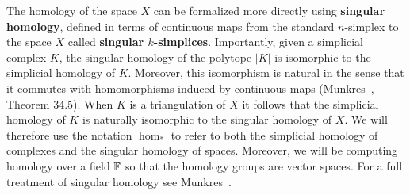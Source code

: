 The homology of the space $X$ can be formalized more directly using \textbf{singular homology}, defined in terms of continuous maps from the standard $n$-simplex to the space $X$ called \textbf{singular $k$-simplices}.
Importantly, given a simplicial complex $K$, the singular homology of the polytope $|K|$ is isomorphic to the simplicial homology of $K$.
Moreover, this isomorphism is natural in the sense that it commutes with homomorphisms induced by continuous maps (Munkres~\cite{munkres84elements}, Theorem 34.5).
When $K$ is a triangulation of $X$ it follows that the simplicial homology of $K$ is naturally isomorphic to the singular homology of $X$.
We will therefore use the notation $\hom_*$ to refer to both the simplicial homology of complexes and the singular homology of spaces.
Moreover, we will be computing homology over a field $\mathbb{F}$ so that the homology groups are vector spaces.
For a full treatment of singular homology see Munkres~\cite{munkres84elements}.


